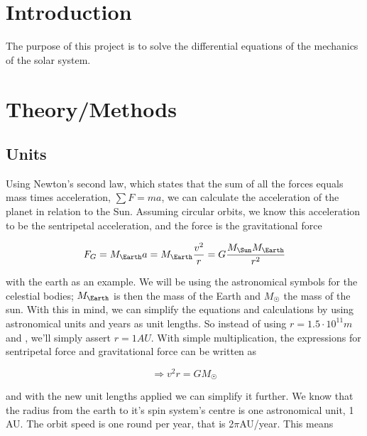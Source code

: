 \documentclass[10pt]{article}
\begin{document}
\begin{multicols}{2}
\tableofcontents

{}

\section{Introduction}
The purpose of this project is to solve the differential equations of the
mechanics of the solar system.

\section{Theory/Methods}
\subsection{Units}
Using Newton's second law, which states that the sum of all the forces
equals mass times acceleration, $\sum F=ma$, we can calculate the
acceleration of the planet in relation to the Sun. Assuming circular
orbits, we know this acceleration to be the sentripetal acceleration, and
the force is the gravitational force

\begin{equation}
    F_G = M_\Earth a = M_\Earth\frac{v^2}{r} = G\frac{M_\Sun M_\Earth}{r^2}
\end{equation}



with the earth as an example. We will be using the astronomical symbols for
the celestial bodies; $M_\Earth$ is then the mass of the Earth and $M_\Sun$ the mass
of the sun. With this in mind, we can simplify the equations and
calculations by using astronomical units and years as unit lengths. So
instead of using $r = 1.5\cdot10^{11}m$ and , we'll simply assert $r =
1AU$. With simple multiplication, the expressions for sentripetal force and
gravitational force can be written as 

\begin{equation}\label{eq:circVel}
    \Rightarrow v^2r = GM_\Sun
\end{equation}

and with the new unit lengths applied we can simplify it further. We know
that the radius from the earth to it's spin system's centre is one
astronomical unit, 1 AU. The orbit speed is one round per year, that is
2$\pi$AU/year. This means


\end{multicols}
\end{document}

